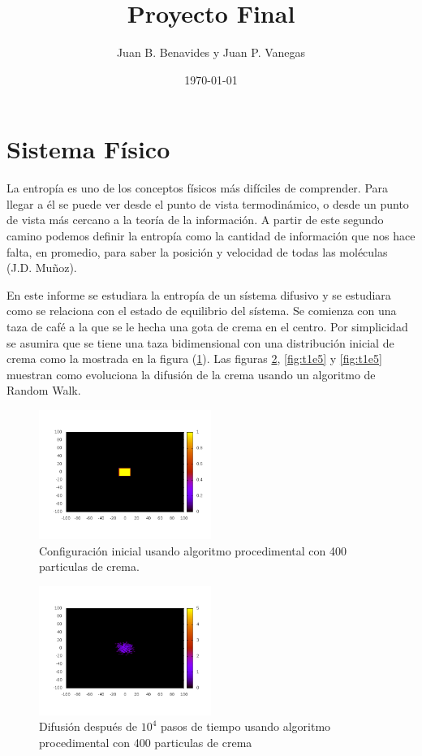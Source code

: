\documentclass[12pt,twocolumn]{article}
\title{Proyecto Final}
\author{Juan B. Benavides y Juan P. Vanegas }
\date{\today}
\begin{document}
\maketitle

\section{\label{sec: Intro} Sistema Físico}
La entropía es uno de los conceptos físicos más difíciles de comprender. Para llegar a 
él se puede ver desde el punto de vista termodinámico, o desde un punto de vista más 
cercano a la teoría de la información. A partir de este segundo camino podemos definir la 
entropía como la cantidad de información que nos hace falta, en promedio, para saber la posición 
y velocidad de todas las moléculas (J.D. Muñoz). 

En este informe se estudiara la entropía de un sístema difusivo y se estudiara como se relaciona 
con el estado de equilibrio del sístema. Se comienza con una taza de café a la que se le hecha una 
gota de crema en el centro. Por simplicidad se asumira que se tiene una taza bidimensional con una 
distribución inicial de crema como la mostrada en la figura (\ref{fig:t0}). Las figuras \ref{fig:t1e4}, 
\ref{fig:t1e5} y \ref{fig:t1e5} muestran como evoluciona la difusión de la crema usando un algoritmo de 
Random Walk.

\begin{figure}
    \centering
    \includegraphics[width=0.5\textwidth]{figs/t_0.png}
    \caption{Configuración inicial usando algoritmo procedimental con 400 particulas de crema.}
    \label{fig:t0}
\end{figure}

\begin{figure}
    \centering
    \includegraphics[width=0.5\textwidth]{figs/t_1e4.png}
    \caption{Difusión después de $10^4$ pasos de tiempo usando 
        algoritmo procedimental con 400 particulas de crema}
    \label{fig:t1e4}
\end{figure}
\end{document}
